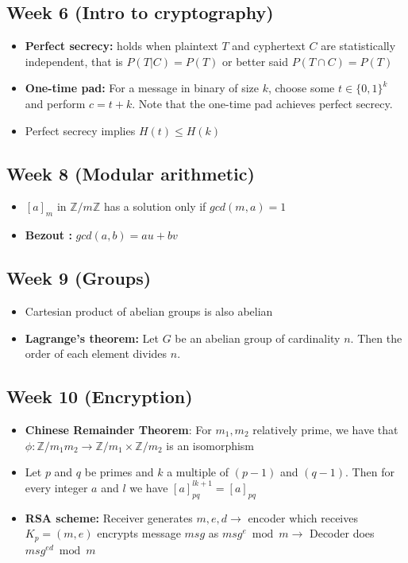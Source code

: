 \documentclass[titlepage]{article}
\begin{document}
\subsection{Week 6 (Intro to cryptography)}
\begin{itemize}
    \item \textbf{Perfect secrecy:} holds when plaintext $T$ and cyphertext $C$ are statistically independent, that is $P(T|C) = P(T)$ or better said $P(T\cap C) = P(T)$
    \item \textbf{One-time pad:} For a message in binary of size $k$, choose some $t \in \{0,1\}^{k}$ and perform $c = t + k$. Note that the one-time pad achieves perfect secrecy. 
    \item Perfect secrecy implies $H(t) \leq H(k)$
\end{itemize}


\subsection{Week 8 (Modular arithmetic)}
\begin{itemize}
    \item $[a]_{m}$ in $\mathbb{Z}/m\mathbb{Z}$ has a solution only if $gcd(m,a)=1$
    \item \textbf{Bezout :} $gcd(a,b) = au + bv$
\end{itemize}

\subsection{Week 9 (Groups)}
\begin{itemize}
    \item Cartesian product of abelian groups is also abelian 
    \item \textbf{Lagrange's theorem:} Let $G$ be an abelian group of cardinality $n$. Then the order of each element divides $n$. 
\end{itemize}

\subsection{Week 10 (Encryption)}
\begin{itemize}
    \item \textbf{Chinese Remainder Theorem}: For $m_{1},m_{2}$ relatively prime, we have that $\phi: \mathbb{Z}/m_{1}m_{2} \to \mathbb{Z}/m_{1} \times \mathbb{Z}/m_{2} $ is an isomorphism
    \item Let $p$ and $q$ be primes and $k$ a multiple of $(p-1)$ and $(q-1)$. Then for every integer $a$ and $l$ we have $[a]_{pq}^{lk+1} = [a]_{pq}$
    \item \textbf{RSA scheme:} Receiver generates $m,e,d \xrightarrow{}$ encoder which receives $K_{p} = (m,e)$ encrypts message $msg$ as $msg^{e} \bmod{m} \xrightarrow{}$  Decoder does $msg^{ed} \bmod{m}$
\end{itemize}
\end{document}
